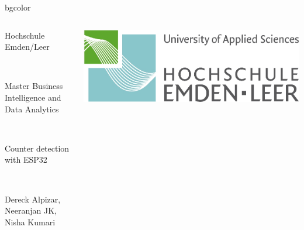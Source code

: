{%
\begin{beamercolorbox}[rounded=true, center]{bgcolor}
\begin{columns}[T]
\begin{column}{9cm}
{\color{gray}\begin{tiny}Hochschule Emden/Leer\end{tiny}} \\ 
{\color{gray}\begin{tiny}Master Business Intelligence and Data Analytics\end{tiny}} \\ 
{\color{gray}\begin{tiny}Counter detection with ESP32\end{tiny}} \\
{\color{gray}\begin{tiny}Dereck Alpizar, Neeranjan JK, Nisha Kumari \end{tiny}}
\end{column}
\begin{column}{2cm}
\includegraphics[scale=0.25]{img/technik.jpg}
\end{column}
\end{columns}
\end{beamercolorbox}
 }
\insertsectionhead
\insertsubsectionhead
{}
\usebackgroundtemplate
{%
      \rule{0pt}{\paperheight}%
      \hspace*{\paperwidth}%
 }

